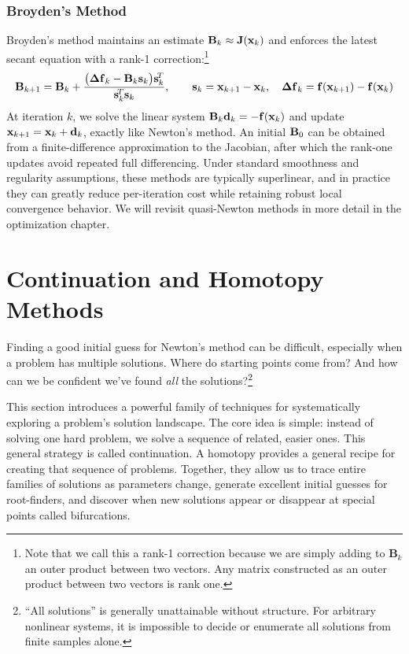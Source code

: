 \subsubsection{Broyden's Method}
Broyden's method maintains an estimate $\mathbf{B}_k \approx \mathbf{J}(\mathbf{x}_k)$ and enforces the latest secant equation with a rank-1 correction:\footnote{Note that we call this a rank-1 correction because we are simply adding to $\mathbf B_k$ an outer product between two vectors. Any matrix constructed as an outer product between two vectors is rank one. }
\begin{equation}
  \mathbf{B}_{k+1}
  =
  \mathbf{B}_k
  +
  \frac{\bigl(\mathbf{\Delta f}_k - \mathbf{B}_k \mathbf{s}_k\bigr)\mathbf{s}_k^{\!T}}
       {\mathbf{s}_k^{\!T}\mathbf{s}_k},
  \qquad
  \mathbf{s}_k = \mathbf{x}_{k+1}-\mathbf{x}_k,
  \quad
  \mathbf{\Delta f}_k = \mathbf{f}(\mathbf{x}_{k+1})-\mathbf{f}(\mathbf{x}_k)
\end{equation}
At iteration $k$, we solve the linear system $\mathbf{B}_k \mathbf{d}_k = -\mathbf{f}(\mathbf{x}_k)$ and update $\mathbf{x}_{k+1}=\mathbf{x}_k+\mathbf{d}_k$, exactly like Newton's method. An initial $\mathbf{B}_0$ can be obtained from a finite-difference approximation to the Jacobian, after which the rank-one updates avoid repeated full differencing. Under standard smoothness and regularity assumptions, these methods are typically superlinear, and in practice they can greatly reduce per-iteration cost while retaining robust local convergence behavior. We will revisit quasi-Newton methods in more detail in the optimization chapter.


\section{Continuation and Homotopy Methods}

Finding a good initial guess for Newton's method can be difficult, especially when a problem has multiple solutions. Where do starting points come from? And how can we be confident we've found \emph{all} the solutions?\footnote{``All solutions'' is generally unattainable without structure. For arbitrary nonlinear systems, it is impossible to decide or enumerate all solutions from finite samples alone.}  %

This section introduces a powerful family of techniques for systematically exploring a problem's solution landscape. The core idea is simple: instead of solving one hard problem, we solve a sequence of related, easier ones. This general strategy is called continuation. A homotopy provides a general recipe for creating that sequence of problems. Together, they allow us to trace entire families of solutions as parameters change, generate excellent initial guesses for root-finders, and discover when new solutions appear or disappear at special points called bifurcations.


